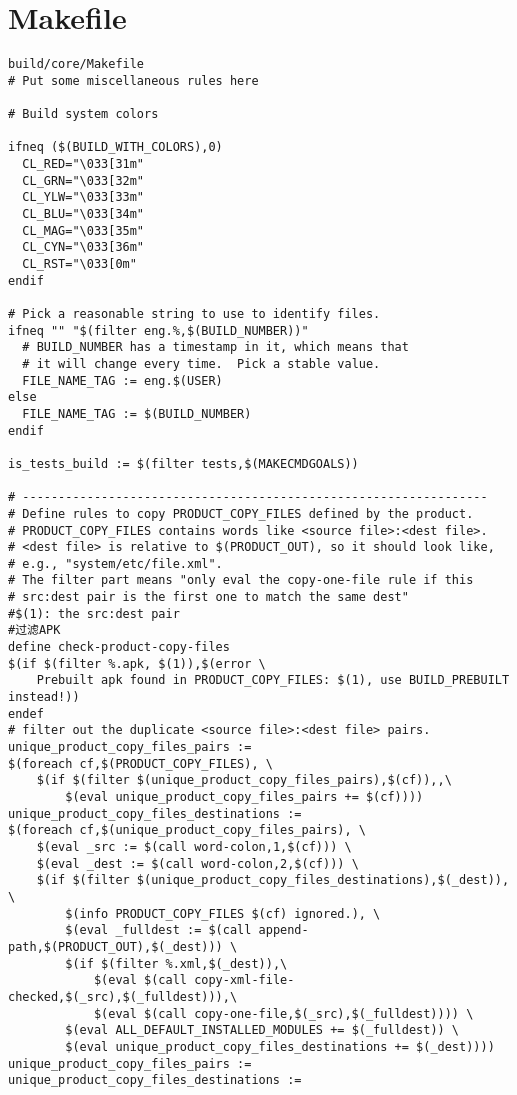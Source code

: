 \documentclass[12pt,a4paper]{article}
\begin{document}
\section{Makefile}
\begin{verbatim}
build/core/Makefile
# Put some miscellaneous rules here

# Build system colors

ifneq ($(BUILD_WITH_COLORS),0)
  CL_RED="\033[31m"
  CL_GRN="\033[32m"
  CL_YLW="\033[33m"
  CL_BLU="\033[34m"
  CL_MAG="\033[35m"
  CL_CYN="\033[36m"
  CL_RST="\033[0m"
endif

# Pick a reasonable string to use to identify files.
ifneq "" "$(filter eng.%,$(BUILD_NUMBER))"
  # BUILD_NUMBER has a timestamp in it, which means that
  # it will change every time.  Pick a stable value.
  FILE_NAME_TAG := eng.$(USER)
else
  FILE_NAME_TAG := $(BUILD_NUMBER)
endif

is_tests_build := $(filter tests,$(MAKECMDGOALS))

# -----------------------------------------------------------------
# Define rules to copy PRODUCT_COPY_FILES defined by the product.
# PRODUCT_COPY_FILES contains words like <source file>:<dest file>.
# <dest file> is relative to $(PRODUCT_OUT), so it should look like,
# e.g., "system/etc/file.xml".
# The filter part means "only eval the copy-one-file rule if this
# src:dest pair is the first one to match the same dest"
#$(1): the src:dest pair
#过滤APK
define check-product-copy-files
$(if $(filter %.apk, $(1)),$(error \
    Prebuilt apk found in PRODUCT_COPY_FILES: $(1), use BUILD_PREBUILT instead!))
endef
# filter out the duplicate <source file>:<dest file> pairs.
unique_product_copy_files_pairs :=
$(foreach cf,$(PRODUCT_COPY_FILES), \
    $(if $(filter $(unique_product_copy_files_pairs),$(cf)),,\
        $(eval unique_product_copy_files_pairs += $(cf))))
unique_product_copy_files_destinations :=
$(foreach cf,$(unique_product_copy_files_pairs), \
    $(eval _src := $(call word-colon,1,$(cf))) \
    $(eval _dest := $(call word-colon,2,$(cf))) \
    $(if $(filter $(unique_product_copy_files_destinations),$(_dest)), \
        $(info PRODUCT_COPY_FILES $(cf) ignored.), \
        $(eval _fulldest := $(call append-path,$(PRODUCT_OUT),$(_dest))) \
        $(if $(filter %.xml,$(_dest)),\
            $(eval $(call copy-xml-file-checked,$(_src),$(_fulldest))),\
            $(eval $(call copy-one-file,$(_src),$(_fulldest)))) \
        $(eval ALL_DEFAULT_INSTALLED_MODULES += $(_fulldest)) \
        $(eval unique_product_copy_files_destinations += $(_dest))))
unique_product_copy_files_pairs :=
unique_product_copy_files_destinations :=


\end{verbatim}
\end{document}
